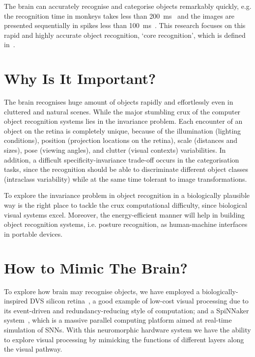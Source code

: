 The brain can accurately recognise and categorise objects remarkably quickly, e.g. the recognition time in monkeys takes less than 200~ms~\cite{fabre1998rapid} and the images are presented sequentially in spikes less than 100~ms~\cite{keysers2001speed}.
This research focuses on this rapid and highly accurate object recognition, `core recognition', which is defined in~\cite{dicarlo2007untangling}.


\section{Why Is It Important?}
\label{sec:imp}
The brain recognises huge amount of objects rapidly and effortlessly even in cluttered and natural scenes.
While the major stumbling crux of the computer object recognition systems lies in the invariance problem.
Each encounter of an object on the retina is completely unique, because of the illumination (lighting conditions), position (projection locations on the retina), scale (distances and sizes), pose (viewing angles), and clutter (visual contexts) variabilities.
In addition, a difficult specificity-invariance trade-off occurs in the categorisation tasks, since the recognition should be able to discriminate different object classes (intraclass variability) while at the same time tolerant to image transformations.   

To explore the invariance problem in object recognition in a biologically plausible way is the right place to tackle the crux computational difficulty, since biological visual systems excel.
Moreover, the energy-efficient manner will help in building object recognition systems, i.e. posture recognition, as human-machine interfaces in portable devices.  

\section{How to Mimic The Brain?}
\label{sec:brn}
To explore how brain may recognise objects, we have employed a biologically-inspired DVS silicon retina~\cite{lenero20113}, a good example of low-cost visual processing due to its event-driven and redundancy-reducing style of computation;
and a SpiNNaker system~\cite{furber2014spinnaker}, which is a massive parallel computing platform aimed at real-time simulation of SNNs. 
With this neuromorphic hardware system we have the ability to explore visual processing by mimicking the functions of different layers along the visual pathway. 

